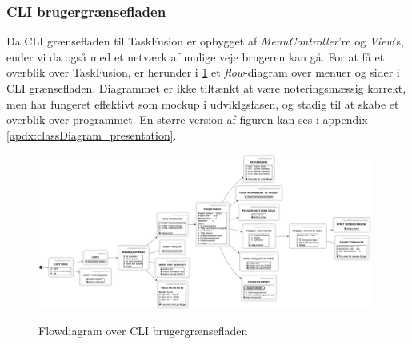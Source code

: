 \subsubsection{CLI brugergrænsefladen}
Da CLI grænsefladen til TaskFusion er opbygget af \textit{MenuController}'re og \textit{View}'s, ender vi da også med et netværk af mulige veje brugeren kan gå. For at få et overblik over TaskFusion, er herunder i \ref{fig:flow_cli} et \textit{flow}-diagram over menuer og sider i CLI grænsefladen. Diagrammet er ikke tiltænkt at være noteringsmæssig korrekt, men har fungeret effektivt som mockup i udviklgsfasen, og stadig til at skabe et overblik over programmet. En større version af figuren kan ses i appendix \ref{apdx:classDiagram_presentation}.
\begin{figure}[H]
    \centering
    \caption{Flowdiagram over CLI brugergrænsefladen}
    \includegraphics[width = 11cm, keepaspectratio]{TaskFusion/out/assets/diagrams/flow_cli/flow_cli.png}
    \label{fig:flow_cli}
\end{figure}